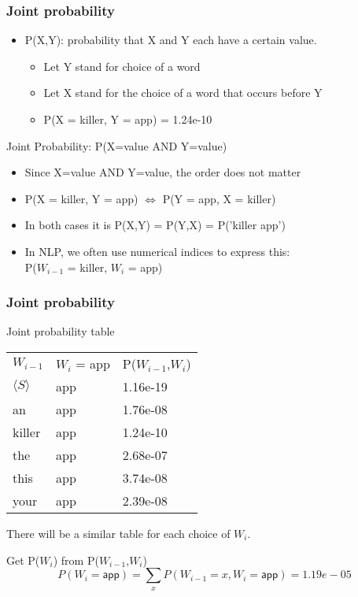\begin{frame}
\frametitle{Joint probability}
\begin{itemize}[<+->]
\item P(X,Y): probability that X and Y each have a certain value.
\begin{itemize}[<+->]
\item Let Y stand for choice of a word
\item Let X stand for the choice of a word that occurs before Y
\item P(X = killer, Y = app) = 1.24e-10
\end{itemize}
\end{itemize}
\pause
\begin{alertblock}{Joint Probability: P(X=value AND Y=value)}
\begin{itemize}
\item Since X=value AND Y=value, the order does not matter
\item {\color{blue} P(X = killer, Y = app)} $\Leftrightarrow$ {\color{red} P(Y = app, X = killer)}
\item In both cases it is P(X,Y) = P(Y,X) = P('killer app')
\item In NLP, we often use numerical indices to express this: \\
P($W_{i-1}$ = killer, $W_{i}$ = app)
\end{itemize}
\end{alertblock}
\end{frame}

\begin{frame}
\frametitle{Joint probability}
\centering
\begin{block}{Joint probability table}
\begin{tabular}{lll}
\rowcolor{MidnightBlue!50}
$W_{i-1}$ & $W_i$ = app & P($W_{i-1}$,$W_{i}$) \\
$\langle S \rangle$ & app & 1.16e-19 \\
an & app & 1.76e-08 \\
killer & app & 1.24e-10 \\
the & app & 2.68e-07 \\
this & app & 3.74e-08 \\
your & app &  2.39e-08
\end{tabular}

\smallskip
There will be a similar table for each choice of $W_i$.
\end{block}
\begin{block}{Get P($W_i$) from P($W_{i-1}$,$W_{i}$)}
\[ P(W_i=\textsf{app}) = \sum_{x} P(W_{i-1}=x,W_i=\textsf{app}) = 1.19e-05 \]
\end{block}
\end{frame}


